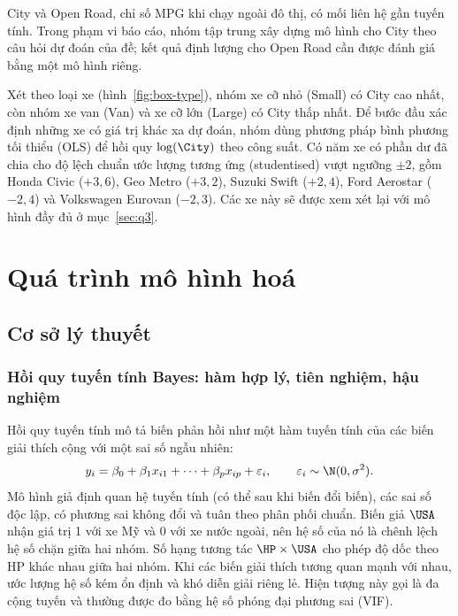 \documentclass[12pt,a4paper]{report}
\begin{document}
City và Open Road, chỉ số MPG khi chạy ngoài đô thị, có mối liên hệ gần tuyến
tính. Trong phạm vi báo cáo, nhóm tập trung xây dựng mô hình cho City theo câu
hỏi dự đoán của đề; kết quả định lượng cho Open Road cần được đánh giá bằng một
mô hình riêng.


Xét theo loại xe (hình~\ref{fig:box-type}), nhóm xe cỡ nhỏ (Small) có City cao
nhất, còn nhóm xe van (Van) và xe cỡ lớn (Large) có City thấp nhất. Để bước đầu
xác định những xe có giá trị khác xa dự đoán, nhóm dùng phương pháp bình phương
tối thiểu (OLS) để hồi quy $\log(\City)$ theo công suất. Có năm xe có phần dư
đã chia cho độ lệch chuẩn ước lượng tương ứng (studentised) vượt ngưỡng $\pm 2$,
gồm Honda Civic ($+3{,}6$), Geo Metro ($+3{,}2$), Suzuki Swift ($+2{,}4$), Ford
Aerostar ($-2{,}4$) và Volkswagen Eurovan ($-2{,}3$). Các xe này sẽ được xem xét
lại với mô hình đầy đủ ở mục~\ref{sec:q3}.


\chapter{Quá trình mô hình hoá}
\label{sec:modeling}

\section{Cơ sở lý thuyết}
\label{sec:theory}

\subsection{Hồi quy tuyến tính Bayes: hàm hợp lý, tiên nghiệm, hậu nghiệm}

Hồi quy tuyến tính mô tả biến phản hồi như một hàm tuyến tính của các biến giải
thích cộng với một sai số ngẫu nhiên:
%
\begin{equation}
  \label{eq:linreg}
  y_i = \beta_0 + \beta_1 x_{i1} + \dots + \beta_p x_{ip} + \varepsilon_i,
  \qquad \varepsilon_i \sim \N(0, \sigma^2).
\end{equation}
%
Mô hình giả định quan hệ tuyến tính (có thể sau khi biến đổi biến), các sai số
độc lập, có phương sai không đổi và tuân theo phân phối chuẩn. Biến giả $\USA$
nhận giá trị 1 với xe Mỹ và 0 với xe nước ngoài, nên hệ số của nó là chênh lệch
hệ số chặn giữa hai nhóm. Số hạng tương tác $\HP \times \USA$ cho phép độ dốc
theo HP khác nhau giữa hai nhóm. Khi các biến giải thích tương quan mạnh với
nhau, ước lượng hệ số kém ổn định và khó diễn giải riêng lẻ. Hiện tượng này gọi
là đa cộng tuyến và thường được đo bằng hệ số phóng đại phương sai (VIF).
\end{document}
